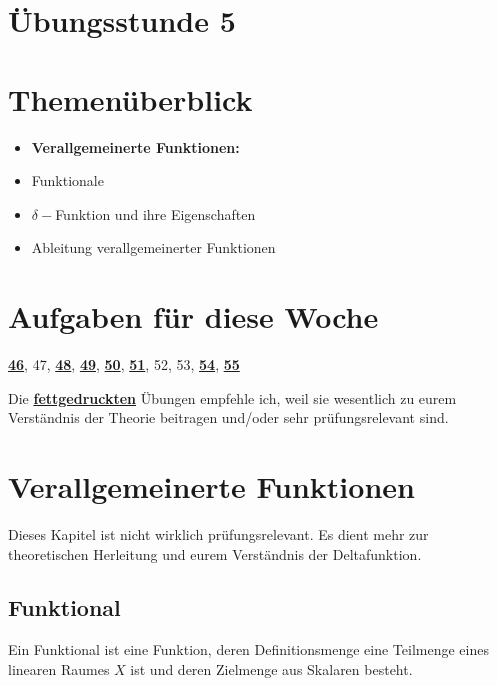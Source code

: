 \documentclass[11pt]{article}
\begin{document}
\thispagestyle{firstpage}

\setlength{\headheight}{1 \baselineskip}  %
\setlength{\parindent}{0pt}  %
\setlength{\parskip}{\baselineskip}  %

\vspace*{-5px}
\section*{Übungsstunde 5}

\section*{Themenüberblick}
\begin{itemize}
    \item \textbf{Verallgemeinerte Funktionen:}
    \item[] Funktionale
    \item[] $\delta-$Funktion und ihre Eigenschaften
    \item[] Ableitung verallgemeinerter Funktionen
\end{itemize}

\section*{Aufgaben für diese Woche}
\vspace{-0.5cm}

\underline{\textbf{46}}, 47, \underline{\textbf{48}}, \underline{\textbf{49}}, \underline{\textbf{50}}, \underline{\textbf{51}}, 52, 53, \underline{\textbf{54}}, \underline{\textbf{55}}\\
\vspace{-0.5cm}

Die \underline{\textbf{fettgedruckten}} Übungen empfehle ich, weil sie wesentlich zu eurem Verständnis der Theorie beitragen und/oder sehr prüfungsrelevant sind.

\vfill \null
\pagebreak

\section*{Verallgemeinerte Funktionen}
\vspace*{-0.5cm}
Dieses Kapitel ist nicht wirklich prüfungsrelevant. Es dient mehr zur theoretischen Herleitung und eurem Verständnis der Deltafunktion.
\vspace*{-0.5cm}
\subsection*{Funktional}
\vspace*{-0.5cm}
Ein Funktional ist eine Funktion, deren Definitionsmenge eine Teilmenge eines linearen Raumes $X$ ist und deren Zielmenge aus Skalaren besteht.
\end{document}
